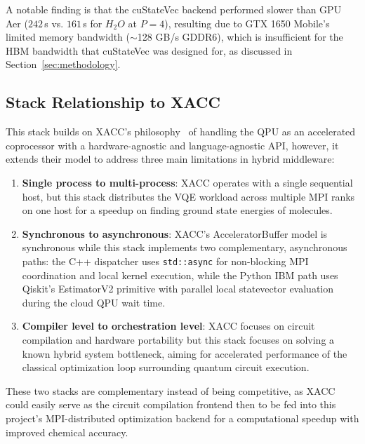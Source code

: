 A notable finding is that the cuStateVec backend performed slower than GPU Aer ($242$\,s vs. $161$\,s for $H_{2}O$ at $P=4$), 
resulting due to GTX 1650 Mobile's limited memory bandwidth ($\sim$128 GB/s GDDR6), which is insufficient for the HBM bandwidth that cuStateVec was designed for, as discussed in Section~\ref{sec:methodology}. 

\subsection{Stack Relationship to XACC}
This stack builds on XACC's philosophy~\parencite{mccaskey2018xacc} of handling the QPU as an accelerated coprocessor with a hardware-agnostic and language-agnostic
API, however, it extends their model to address three main limitations in hybrid middleware:
\begin{enumerate}
    \item \textbf{Single process to multi-process}: XACC operates with a single sequential host, but this stack distributes the VQE workload across multiple MPI ranks on one host for a speedup on finding ground state energies of molecules.
    \item \textbf{Synchronous to asynchronous}: XACC's AcceleratorBuffer model is synchronous while this stack implements two complementary, asynchronous paths: the C++ dispatcher uses \texttt{std::async} for non-blocking MPI coordination and local kernel execution, while the Python IBM path uses Qiskit's EstimatorV2 primitive with parallel local statevector evaluation during the cloud QPU wait time.
    \item \textbf{Compiler level to orchestration level}: XACC focuses on circuit compilation and hardware portability but this stack focuses on solving a known hybrid system bottleneck, aiming for accelerated performance of the classical optimization loop surrounding quantum circuit execution.
\end{enumerate}

These two stacks are complementary instead of being competitive, as XACC could easily serve as the circuit compilation 
frontend then to be fed into this project's MPI-distributed optimization backend for a computational speedup with improved chemical accuracy.


